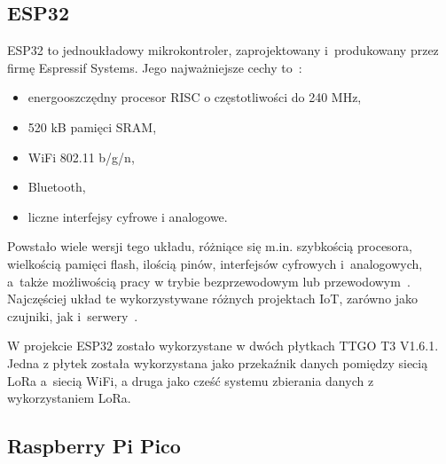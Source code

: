 \subsection{ESP32}
ESP32 to jednoukładowy mikrokontroler, zaprojektowany i~produkowany przez firmę Espressif Systems.
Jego najważniejsze cechy to~\cite{ESP32:datasheet}:
\begin{itemize}
    \item energooszczędny procesor RISC o częstotliwości do 240 MHz,
    \item 520 kB pamięci SRAM,
    \item WiFi 802.11 b/g/n,
    \item Bluetooth,
    \item liczne interfejsy cyfrowe i analogowe.
\end{itemize}

Powstało wiele wersji tego układu, różniące się m.in. szybkością procesora, wielkością pamięci flash, ilością pinów, interfejsów cyfrowych i~analogowych, a~także możliwością pracy w trybie bezprzewodowym lub przewodowym~\cite{ESP32:socs}.
Najczęściej układ te wykorzystywane różnych projektach IoT, zarówno jako czujniki, jak i~serwery~\cite{ESP32:datasheet}.


W projekcie ESP32 zostało wykorzystane w dwóch płytkach TTGO T3 V1.6.1.
Jedna z płytek została wykorzystana jako przekaźnik danych pomiędzy siecią LoRa a~siecią WiFi, a druga jako cześć systemu zbierania danych z wykorzystaniem LoRa.


\subsection{Raspberry Pi Pico}

